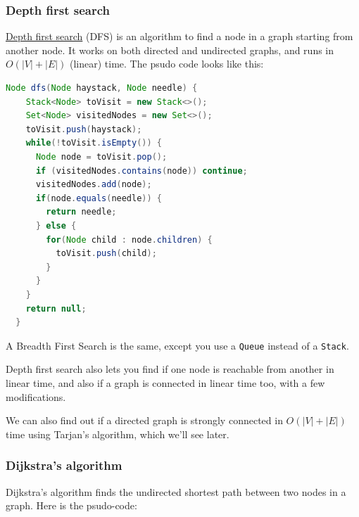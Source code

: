 \subsubsection{Depth first search}
\label{depth-first-search}

\href{https://en.wikipedia.org/wiki/Depth-first_search}{Depth first search}
(DFS) is an algorithm to find a node in a graph starting from another node. It
works on both directed and undirected graphs, and runs in $O(|V| + |E|)$
(linear) time. The psudo code looks like this:


\begin{lstlisting}[language=java]
  Node dfs(Node haystack, Node needle) {
    Stack<Node> toVisit = new Stack<>();
    Set<Node> visitedNodes = new Set<>();
    toVisit.push(haystack);
    while(!toVisit.isEmpty()) {
      Node node = toVisit.pop();
      if (visitedNodes.contains(node)) continue;
      visitedNodes.add(node);
      if(node.equals(needle)) {
        return needle;
      } else {
        for(Node child : node.children) {
          toVisit.push(child);
        }
      }
    }
    return null;
  }
\end{lstlisting}

A Breadth First Search is the same, except you use a \texttt{Queue} instead of a
\texttt{Stack}.


Depth first search also lets you find if one node is reachable from another in
linear time, and also if a graph is connected in linear time too, with a few
modifications.

We can also find out if a directed graph is strongly connected in $O(|V| + |E|)$
time using Tarjan's algorithm, which we'll see later.

\subsubsection{Dijkstra's algorithm}

Dijkstra's algorithm finds the undirected shortest path between two nodes in a
graph. Here is the psudo-code:

